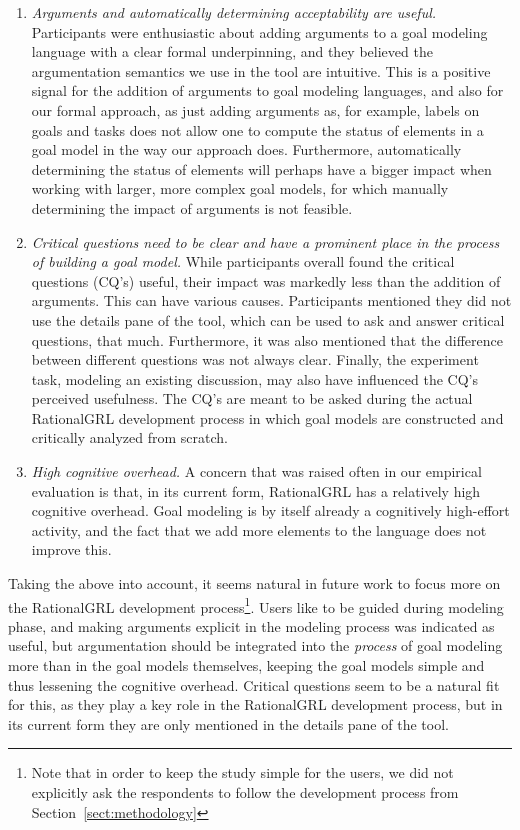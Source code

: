 \begin{enumerate}
\item \emph{Arguments and automatically determining acceptability are useful.} Participants were enthusiastic about adding arguments to a goal modeling language with a clear formal underpinning, and they believed the argumentation semantics we use in the tool are intuitive. This is a positive signal for the addition of arguments to goal modeling languages, and also for our formal approach, as just adding arguments as, for example, labels on goals and tasks does not allow one to compute the status of elements in a goal model in the way our approach does. Furthermore, automatically determining the status of elements will perhaps have a bigger impact when working with larger, more complex goal models, for which manually determining the impact of arguments is not feasible.
\item \emph{Critical questions need to be clear and have a prominent place in the process of building a goal model.} While participants overall found the critical questions (CQ's) useful, their impact was markedly less than the addition of arguments. This can have various causes. Participants mentioned they did not use the details pane of the tool, which can be used to ask and answer critical questions, that much. Furthermore, it was also mentioned that the difference between different questions was not always clear. Finally, the experiment task, modeling an existing discussion, may also have influenced the CQ's perceived usefulness. The CQ's are meant to be asked during the actual RationalGRL development process in which goal models are constructed and critically analyzed from scratch. 
\item \emph{High cognitive overhead.} A concern that was raised often in our empirical evaluation is that, in its current form, RationalGRL has a relatively high cognitive overhead. Goal modeling is by itself already a cognitively high-effort activity, and the fact that we add more elements to the language does not improve this. 
\end{enumerate}

Taking the above into account, it seems natural in future work to focus more on the RationalGRL development process\footnote{Note that in order to keep the study simple for the users, we did not explicitly ask the respondents to follow the development process from Section~\ref{sect:methodology}}. Users like to be guided during modeling phase, and making arguments explicit in the modeling process was indicated as useful, but argumentation should be integrated into the \emph{process} of goal modeling more than in the goal models themselves, keeping the goal models simple and thus lessening the cognitive overhead. Critical questions seem to be a natural fit for this, as they play a key role in the RationalGRL development process, but in its current form they are only mentioned in the details pane of the tool.



